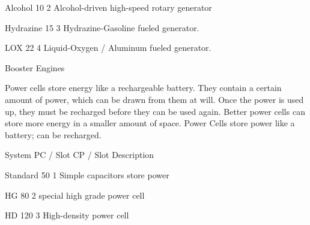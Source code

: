 \documentclass[twoside]{book}
\begin{document}
                      
                      
                       Alcohol   
                       10   
                       2   
                         Alcohol-driven high-speed rotary generator
                         
                      
                      
                       Hydrazine   
                       15   
                       3   
                         Hydrazine-Gasoline fueled generator.
                         
                      
                      
                       LOX   
                       22   
                       4   
                         Liquid-Oxygen / Aluminum fueled generator.
                         
                      
                    
                  Booster Engines  
                  
                    Power cells store energy like a rechargeable
                   battery. They contain a certain amount of power, which
                   can be drawn from them at will. Once the power is used
                   up, they must be recharged before they can be used
                   again. Better power cells can store more energy in a
                   smaller amount of space. 
                    Power Cells store power like a battery; can be
                   recharged. 
                  
                    
                      
                       System   
                       PC / Slot   
                       CP / Slot   
                       Description   
                      
                      
                       Standard   
                       50   
                       1   
                       Simple capacitors store power   
                      
                      
                       HG   
                       80   
                       2   
                       special high grade power cell   
                      
                      
                       HD   
                       120   
                       3   
                       High-density power cell   
                      
\end{document}
